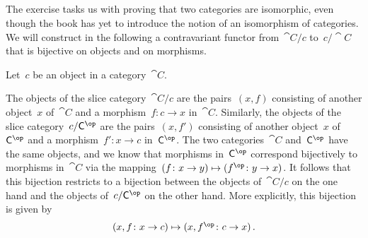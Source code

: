 \subsection{}

The exercise tasks us with proving that two categories are isomorphic, even though the book has yet to introduce the notion of an isomorphism of categories.
We will construct in the following a contravariant functor from~$\cat{C} / c$ to~$c / \cat{C}$ that is bijective on objects and on morphisms.

Let~$c$ be an object in a category~$\cat{C}$.

The objects of the slice category~$\cat{C} / c$ are the pairs~$(x, f)$ consisting of another object~$x$ of~$\cat{C}$ and a morphism~$f \colon c \to x$ in~$\cat{C}$.
Similarly, the objects of the slice category~$c / \cat{C}^{\op}$ are the pairs~$(x, f')$ consisting of another object~$x$ of~$\cat{C}^{\op}$ and a morphism~$f' \colon x \to c$ in~$\cat{C}^{\op}$.
The two categories~$\cat{C}$ and~$\cat{C}^{\op}$ have the same objects, and we know that morphisms in~$\cat{C}^{\op}$ correspond bijectively to morphisms in~$\cat{C}$ via the mapping~$(f \colon x \to y) \mapsto (f^{\op} \colon y \to x)$.
It follows that this bijection restricts to a bijection between the objects of~$\cat{C} / c$ on the one hand and the objects of~$c / \cat{C}^{\op}$ on the other hand.
More explicitly, this bijection is given by
\[
	(x, {\textstyle f \colon x \to c})
	\mapsto
	(x, {\textstyle f^{\op} \colon c \to x}) \,.
\]

